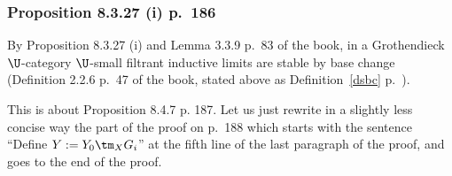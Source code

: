 \documentclass[12pt]{article}
\theoremstyle{remark}
\theoremstyle{definition}
\begin{document}
\subsubsection{Proposition 8.3.27 (i) p.~186}

By Proposition 8.3.27 (i) and Lemma 3.3.9 p.~83 of the book, in a Grothendieck $\U$-category $\U$-small filtrant inductive limits are stable by base change (Definition 2.2.6 p.~47 of the book, stated above as Definition~\ref{dsbc} p.~).




This is about Proposition 8.4.7 p. 187. Let us just rewrite in a slightly less concise way the part of the proof on p.~188 which starts with the sentence ``Define $Y:=Y_0\tm_XG_i$'' at the fifth line of the last paragraph of the proof, and goes to the end of the proof. 
\end{document}

